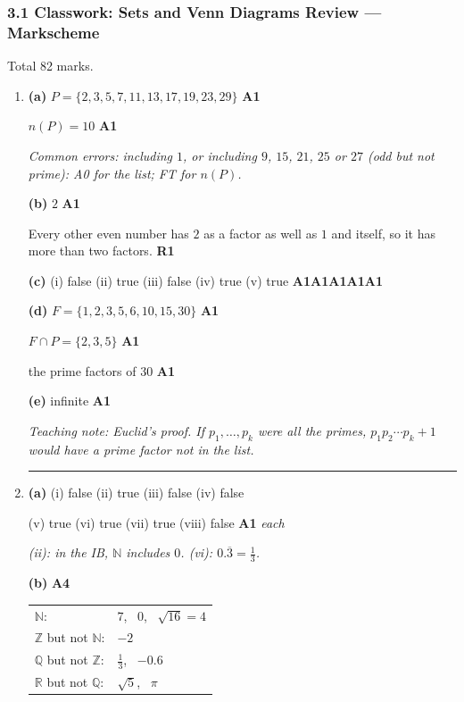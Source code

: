 \documentclass[12pt, twoside]{article}
\begin{document}
\subsubsection*{3.1 Classwork: Sets and Venn Diagrams Review --- Markscheme}

Total 82 marks.

\begin{enumerate}[itemsep=0.3cm]

\item[1.] [Maximum mark: 13]

\textbf{(a)} $P = \{2, 3, 5, 7, 11, 13, 17, 19, 23, 29\}$ \hfill \textbf{A1}

$n(P) = 10$ \hfill \textbf{A1}

\emph{Common errors: including $1$, or including $9$, $15$, $21$, $25$ or
$27$ (odd but not prime): A0 for the list; FT for $n(P)$.}

\textbf{(b)} $2$ \hfill \textbf{A1}

Every other even number has $2$ as a factor as well as $1$ and itself,
so it has more than two factors. \hfill \textbf{R1}

\textbf{(c)} (i) false \quad (ii) true \quad (iii) false \quad (iv) true
\quad (v) true \hfill \textbf{A1A1A1A1A1}

\textbf{(d)} $F = \{1, 2, 3, 5, 6, 10, 15, 30\}$ \hfill \textbf{A1}

$F \cap P = \{2, 3, 5\}$ \hfill \textbf{A1}

the prime factors of $30$ \hfill \textbf{A1}

\textbf{(e)} infinite \hfill \textbf{A1}

\emph{Teaching note: Euclid's proof. If $p_1, \ldots, p_k$ were all the
primes, $p_1 p_2 \cdots p_k + 1$ would have a prime factor not in the list.}

\bigskip \hrule \bigskip

\item[2.] [Maximum mark: 12]

\textbf{(a)} (i) false \quad (ii) true \quad (iii) false \quad (iv) false

(v) true \quad (vi) true \quad (vii) true \quad (viii) false
\hfill \textbf{A1} \emph{each}

\emph{(ii): in the IB, $\mathbb{N}$ includes $0$. (vi):
$0.\overline{3} = \frac{1}{3}$.}

\textbf{(b)} \hfill \textbf{A4}

\begin{tabular}{ll}
$\mathbb{N}$: & $7$, \ $0$, \ $\sqrt{16} = 4$ \\
$\mathbb{Z}$ but not $\mathbb{N}$: & $-2$ \\
$\mathbb{Q}$ but not $\mathbb{Z}$: & $\frac{1}{3}$, \ $-0.6$ \\
$\mathbb{R}$ but not $\mathbb{Q}$: & $\sqrt{5}$, \ $\pi$
\end{tabular}


\end{enumerate}
\end{document}
